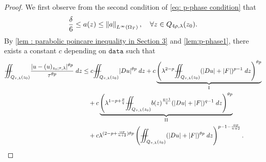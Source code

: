 \documentclass[11pt,oneside, english,reqno,twoside a4paper]{amsart}
\theoremstyle{definition}
\numberwithin{theorem}{section}
\numberwithin{equation}{section}
\newcommand{\Norm}[1]{\left|\hspace{-0.3mm}\left| #1 \right|\hspace{-0.3mm}\right|}
\newcommand{\iintss}{{\int\hspace{-0.28cm}\int}}
\newcommand{ \miints }{{\iintss\hspace{-0.56cm} -\hspace{-0.15cm}-}}
\newcommand{\miint}[1]{{\miints_{\hspace{-0.13cm}#1}}}
\begin{document}
\begin{proof}
We first observe from the second condition of \eqref{eq: p-phase condition} that
\begin{equation} \label{eq:bounds_of_a}
\frac{\delta}{6} \leq a(z) \leq \Norm{a}_{L^{\infty}(\Omega_T)}, \quad \forall z \in Q_{4\rho,\lambda}(z_0).
\end{equation}
By \cref{lem : parabolic poincare inequality in Section 3} and \cref{lem:p-phase1}, there exists a constant $c$ depending on $\texttt{data}$ such that 
\begin{align*}
\miint{Q_{\tau,\lambda}(z_0)}\frac{|u-(u)_{z_0;\tau,\lambda}|^{\theta p}}{\tau^{\theta p}}\; dz&\leq c\miint{Q_{\tau,\lambda}(z_0)} |Du|^{\theta p} \; dz + c\underbrace{\left(\lambda^{2-p}\miint{Q_{\tau,\lambda}(z_0)} (|Du|+|F|)^{p-1}\;dz \right)^{\theta p}}_{\mathrm{I}}\\
&\quad + c\underbrace{\left(\lambda^{1-p+\frac{p}{q}}\miint{Q_{\tau,\lambda}(z_0)} b(z)^{\frac{q-1}{q}}(|Du|+|F|)^{q-1}\; dz \right)^{\theta p}}_{\mathrm{II}}\\
&\quad + c\lambda^{(2-p+\frac{\alpha p}{n+2})\theta p}\left(\miint{Q_{\tau,\lambda}(z_0)} (|Du|+|F|)^{\theta p}\; dz \right)^{p-1-\frac{\alpha p}{n+2}}.
\end{align*}


\end{proof}
\end{document}
